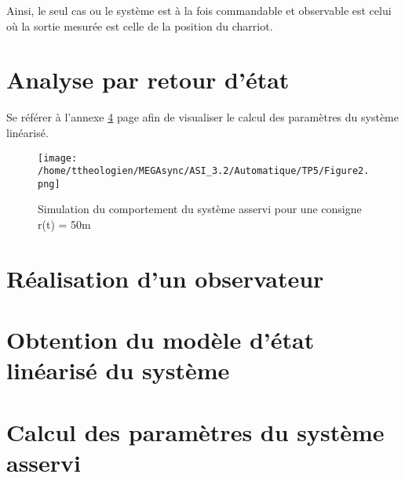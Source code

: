 \documentclass[a4paper,12pt]{article}
\begin{document}
    \par Ainsi, le seul cas ou le système est à la fois commandable et observable est celui où la sortie mesurée est celle de la position du charriot.
  \newpage

  \section{Analyse par retour d'état}
  \label{sec:Analyse par retour d'état}
    \par Se référer à l'annexe \ref{sec:Calcul des paramètres du système asservi} page \pageref{sec:Calcul des paramètres du système asservi}
    afin de visualiser le calcul des paramètres du système linéarisé.

    \begin{figure}[h]
      \caption{Simulation du comportement du système asservi pour une consigne r(t) = 50m}
      \centering
      \texttt{[image: /home/ttheologien/MEGAsync/ASI\_3.2/Automatique/TP5/Figure2.png]}
    \end{figure}
  \newpage

  \section{Réalisation d'un observateur}
  \label{sec:Réalisation d'un observateur}
  \newpage

	\appendix
		\section{Obtention du modèle d'état linéarisé du système}
		\label{sec:Obtention du modèle d'état linéarisé du système}
		\newpage

    \section{Calcul des paramètres du système asservi}
    \label{sec:Calcul des paramètres du système asservi}
    \newpage
\end{document}
